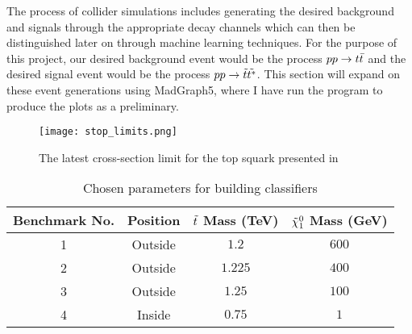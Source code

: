 The process of collider simulations includes generating the desired background and signals through the appropriate decay channels which can then be distinguished later on through machine learning techniques. For the purpose of this project, our desired background event would be the process $ pp \rightarrow t \Bar{t}$ and the desired signal event would be the process $ pp \rightarrow \Tilde{t}\Tilde{t^*} $. This section will expand on these event generations using MadGraph5, where I have run the program to produce the plots as a preliminary. \\

\begin{figure}[htbp]
    \centering
    \texttt{[image: stop\_limits.png]}
    \caption{The latest cross-section limit for the top squark presented in 
    \cite{cms2019search}}
    \label{fig:limits}
\end{figure}


\begin{table}
    \centering
    \begin{tabular}{c|c|c|c} 
    \toprule
    Benchmark No. & Position & $\Tilde{t}$ Mass (TeV) & $\Tilde{\chi}_1^0$ Mass (GeV) \\
    \midrule
    \rowcolor{gray!6} 1 & Outside & $ 1.2 $ & $ 600 $ \\
    2 & Outside & $ 1.225 $ & $ 400 $ \\
    \rowcolor{gray!6} 3 & Outside & $ 1.25 $ & $ 100 $ \\
    4 & Inside & $ 0.75 $ & $ 1 $\\
    \bottomrule
    \end{tabular}
    \caption{Chosen parameters for building classifiers} 
    \label{tab:benchmarks}
\end{table}